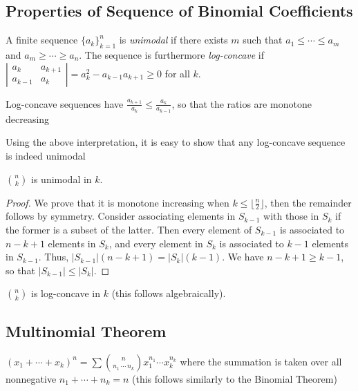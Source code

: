 \documentclass[a4paper]{article}
\begin{document}
\subsection{Properties of Sequence of Binomial Coefficients}

\begin{definition}
A finite sequence $\{a_k\}_{k=1}^n$ is \emph{unimodal} if there exists $m$ such that $a_1\leq\cdots\leq a_m$ and $a_m\geq\cdots\geq a_n$. The sequence is furthermore \emph{log-concave} if $|\begin{smallmatrix}a_k&a_{k+1}\\a_{k-1}&a_k\end{smallmatrix}|=a_k^2-a_{k-1}a_{k+1}\geq0$ for all $k$.
\begin{arrows}
\item Log-concave sequences have $\frac{a_{k+1}}{a_k}\leq\frac{a_k}{a_{k-1}}$, so that the ratios are monotone decreasing
\item Using the above interpretation, it is easy to show that any log-concave sequence is indeed unimodal
\end{arrows}
\end{definition}

\begin{theorem}
$\binom nk$ is unimodal in $k$.

\begin{hl}
\begin{proof}
We prove that it is monotone increasing when $k\leq\lfloor\frac n2\rfloor$, then the remainder follows by symmetry. Consider associating elements in $S_{k-1}$ with those in $S_k$ if the former is a subset of the latter. Then every element of $S_{k-1}$ is associated to $n-k+1$ elements in $S_k$, and every element in $S_k$ is associated to $k-1$ elements in $S_{k-1}$. Thus, $|S_{k-1}|(n-k+1)=|S_k|(k-1)$. We have $n-k+1\geq k-1$, so that $|S_{k-1}|\leq|S_k|$.
\end{proof}
\end{hl}
\end{theorem}

\begin{theorem}
$\binom nk$ is log-concave in $k$ (this follows algebraically).
\end{theorem}

\subsection{Multinomial Theorem}

\begin{theorem}
$\displaystyle (x_1+\cdots+x_k)^n=\sum\binom n{n_1\,\cdots\,n_k}x_1^{n_1}\cdots x_k^{n_k}$ where the summation is taken over all nonnegative $n_1+\cdots+n_k=n$ (this follows similarly to the Binomial Theorem)
\end{theorem}
\end{document}
